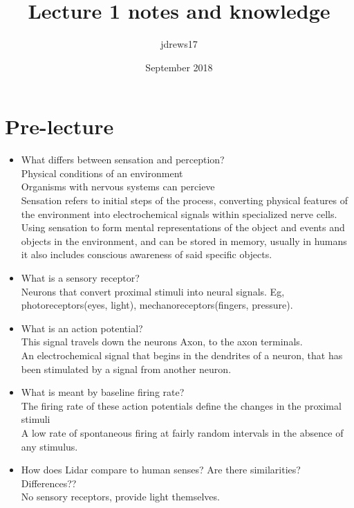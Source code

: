 \documentclass{article}
\title{Lecture 1 notes and knowledge}
\author{jdrews17}
\date{September 2018}
\begin{document}
\maketitle
\newpage

\section{Pre-lecture}
\begin{itemize}
  \item What differs between sensation and perception?\\
  Physical conditions of an environment\\
  Organisms with nervous systems can percieve\\
  Sensation refers to initial steps of the process, converting physical features of the environment into electrochemical signals within specialized nerve cells.\\
  Using sensation to form mental representations of the object and events and objects in the environment, and can be stored in memory, usually in humans it also includes conscious awareness of said specific objects.\\
  \item What is a sensory receptor?\\
    Neurons that convert proximal stimuli into neural signals. Eg, photoreceptors(eyes, light), mechanoreceptors(fingers, pressure).\\
  \item What is an action potential?\\
    This signal travels down the neurons Axon, to the axon terminals.\\
    An electrochemical signal that begins in the dendrites of a neuron, that has been stimulated by a signal from another neuron.

  \item What is meant by baseline firing rate?\\
    The firing rate of these action potentials define the changes in the proximal stimuli\\
    A low rate of spontaneous firing at fairly random intervals in the absence of any stimulus.

  \item How does Lidar compare to human senses? Are there similarities? Differences??\\
    No sensory receptors, provide light themselves.
\end{itemize}
\end{document}
